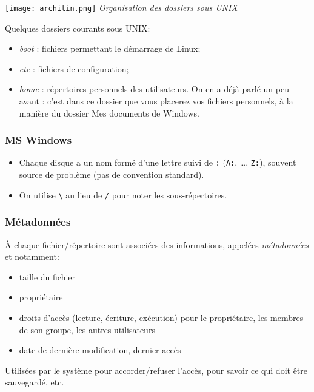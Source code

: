\begin{minipage}[c]{.49\linewidth}
\begin{center}
\texttt{[image: archilin.png]}
\textit{Organisation des dossiers sous UNIX}
\end{center}
\end{minipage} \hfill
\begin{minipage}[c]{.49\linewidth}

Quelques dossiers courants sous UNIX:
\begin{itemize}
\item \textit{boot} : fichiers permettant le démarrage de Linux;
\item \textit{etc} : fichiers de configuration;
\item \textit{home} : répertoires personnels des utilisateurs. On en a déjà parlé un peu avant : c'est dans ce dossier que vous placerez vos fichiers personnels, à la manière du dossier Mes documents de Windows.
\end{itemize}
\end{minipage}

\subsubsection{MS Windows}

\begin{itemize}
\item Chaque disque a un nom formé d'une lettre suivi de
  \og{}\texttt{:}\fg{} (\texttt{A:}, \ldots{}, \texttt{Z:}), souvent
  source de problème (pas de convention standard).
\item On utilise \texttt{\textbackslash{}} au lieu de \texttt{/} pour
  noter les sous-répertoires.
\end{itemize}

\subsubsection{Métadonnées}
À chaque fichier/répertoire sont associées des informations, appelées
\emph{métadonnées} et notamment:
\begin{itemize}
\item taille du fichier
\item propriétaire
\item droits d'accès (lecture, écriture, exécution) pour le
  propriétaire, les membres de son groupe, les autres utilisateurs
\item date de dernière modification, dernier accès
\end{itemize}
Utilisées par le système pour accorder/refuser l'accès, pour savoir ce
qui doit être sauvegardé, etc.

